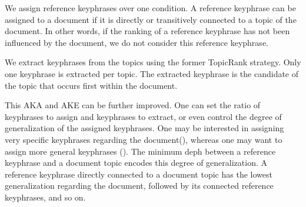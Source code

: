     We assign reference keyphrases over one condition. A reference keyphrase can
    be assigned to a document if it is directly or transitively connected to a
    topic of the document. In other words, if the ranking of a reference
    keyphrase has not been influenced by the document, we do not consider this
    reference keyphrase.

    We extract keyphrases from the topics using the former TopicRank strategy.
    Only one keyphrase is extracted per topic. The extracted keyphrase is the
    candidate of the topic that occurs first within the document.

    This AKA and AKE can be further improved. One can set the ratio of
    keyphrases to assign and keyphrases to extract, or even control the degree
    of generalization of the assigned keyphrases. One may be interested in
    assigning very specific keyphrases regarding the document(),
    whereas one may want to assign more general keyphrases (). The
    minimum deph between a reference keyphrase and a document topic encodes this
    degree of generalization. A reference keyphrase directly connected to a
    document topic has the lowest generalization regarding the document,
    followed by its connected reference keyphrases, and so on.

